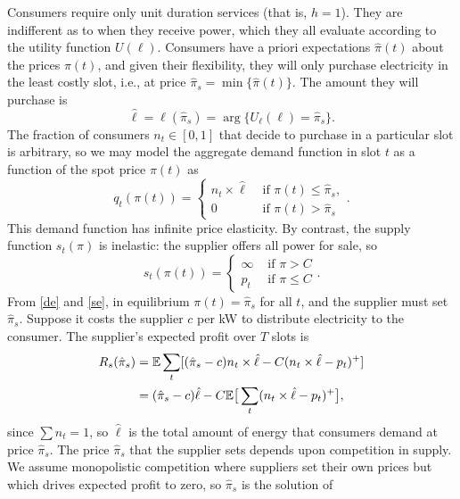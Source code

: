 \documentclass[10pt,draftcls,onecolumn]{IEEEtran}
\newcounter{l1}
\newcounter{l2}
\newcounter{l3}
\newcommand{\expec}{\mathbb{E}}
\begin{document}
Consumers require only unit duration services (that is, $h=1$).  They are indifferent as to when they receive power, which they all evaluate according to the  utility
function $U(\ell)$.  Consumers have a priori expectations $\hat{\pi}(t)$ about the prices $\pi(t)$, and given their flexibility, they will only purchase
electricity in the least costly slot, i.e., at price $\hat{\pi}_s = \min \{\hat{\pi}(t)\}$.  The amount they will purchase is
\[ \hat{\ell} = \ell(\hat{\pi}_s) = \arg \{U_{\ell} (\ell) =  \hat{\pi}_s\} .\] 
The fraction of consumers $n_t \in [0,1]$ that decide to purchase in a particular slot is arbitrary, so we may model the aggregate demand function in slot $t$ as a function of the spot price $\pi (t)$ as
\begin{equation} \label{de}
q_t (\pi (t) ) = \left\{
\begin{array}{ll}
n_t \times \hat{\ell} & \mbox{ if } \pi(t) \le \hat{\pi}_s, \\
0 & \mbox{ if } \pi (t)> \hat{\pi}_s
\end{array}
\right . .
\end{equation}
This demand function has infinite price elasticity.  By contrast, the supply function $s_t(\pi)$ is inelastic: the supplier offers all power for sale, so
\begin{equation} \label{se}
s_t (\pi (t)) = \left\{
\begin{array}{ll}
\infty & \mbox{ if } \pi > C \\
p_t  & \mbox{ if } \pi \le C
\end{array}
\right . .
\end{equation}
From \eqref{de} and \eqref{se}, in equilibrium $\pi(t) = \hat{\pi}_s$ for all $t$, and the supplier must set $\hat{\pi}_s$.
Suppose it costs the supplier $c$ per kW to distribute electricity to the consumer.  The supplier's expected profit over $T$ slots is
\begin{align*}
R_s(\hat{\pi}_s) &= \expec \sum_t [(\hat{\pi}_s -c) n_t \times \hat{\ell} -C (n_t \times \hat{\ell}-p_t)^+] \notag \\
&= (\hat{\pi}_s -c) \hat{\ell} -C \expec \big [\sum_t (n_t \times \hat{\ell}-p_t)^+ \big ],
\end{align*}
since $\sum n_t =1$, so $\hat{\ell}$ is the total amount of energy that consumers  demand at price $\hat{\pi}_s$. The price $\hat{\pi}_s$ that the supplier  sets  depends upon competition in supply.  We assume monopolistic competition where suppliers set their own prices but  which drives expected profit to zero, so
$\hat{\pi}_s$ is the solution of
\end{document}
